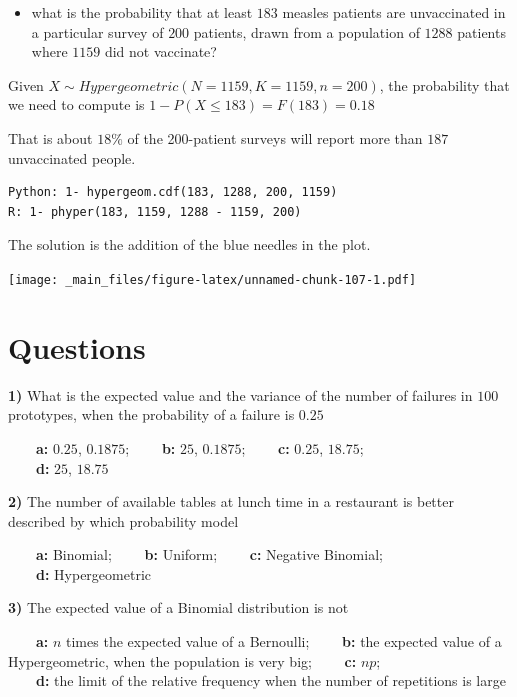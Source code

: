 \documentclass[
]{book}
\providecommand{\tightlist}{%
  \setlength{\itemsep}{0pt}\setlength{\parskip}{0pt}}
\begin{document}
\begin{itemize}
\tightlist
\item
  what is the probability that at least \(183\) measles patients are unvaccinated in a particular survey of \(200\) patients, drawn from a population of \(1288\) patients where \(1159\) did not vaccinate?
\end{itemize}

Given \(X \sim Hypergeometric(N=1159,K=1159,n=200)\), the probability that we need to compute is
\(1-P(X \leq 183)=F(183)=0.18\)

That is about \(18\%\) of the 200-patient surveys will report more than \(187\) unvaccinated people.

\begin{verbatim}
Python: 1- hypergeom.cdf(183, 1288, 200, 1159)
R: 1- phyper(183, 1159, 1288 - 1159, 200)
\end{verbatim}

The solution is the addition of the blue needles in the plot.

\texttt{[image: \_main\_files/figure-latex/unnamed-chunk-107-1.pdf]}

\hypertarget{questions-4}{%
\section{Questions}\label{questions-4}}

\textbf{1)} What is the expected value and the variance of the number of failures in \(100\) prototypes, when the probability of a failure is \(0.25\)

\textbf{\(\qquad\)a:} \(0.25\), \(0.1875\);
\textbf{\(\qquad\)b:} \(25\), \(0.1875\);
\textbf{\(\qquad\)c:} \(0.25\), \(18.75\);\\
\textbf{\(\qquad\)d:} \(25\), \(18.75\)

\textbf{2)} The number of available tables at lunch time in a restaurant is better described by which probability model

\textbf{\(\qquad\)a:} Binomial;
\textbf{\(\qquad\)b:} Uniform;
\textbf{\(\qquad\)c:} Negative Binomial;\\
\textbf{\(\qquad\)d:} Hypergeometric

\textbf{3)} The expected value of a Binomial distribution is not

\textbf{\(\qquad\)a:} \(n\) times the expected value of a Bernoulli;
\textbf{\(\qquad\)b:} the expected value of a Hypergeometric, when the population is very big;
\textbf{\(\qquad\)c:} \(np\);\\
\textbf{\(\qquad\)d:} the limit of the relative frequency when the number of repetitions is large
\end{document}
